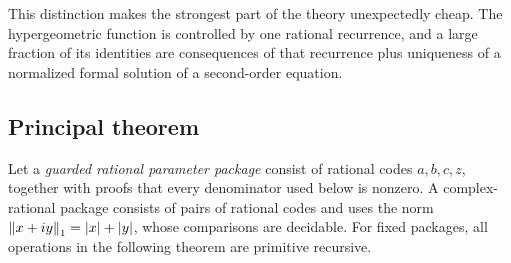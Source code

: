 This distinction makes the strongest part of the theory unexpectedly cheap.
The hypergeometric function is controlled by one rational recurrence, and a
large fraction of its identities are consequences of that recurrence plus
uniqueness of a normalized formal solution of a second-order equation.

\subsection{Principal theorem}

Let a \emph{guarded rational parameter package} consist of rational codes
\(a,b,c,z\), together with proofs that every denominator used below is
nonzero.  A complex-rational package consists of pairs of rational codes and
uses the norm \(\left\lVert x+iy\right\rVert_1=|x|+|y|\), whose comparisons are decidable.
For fixed packages, all operations in the following theorem are primitive
recursive.

